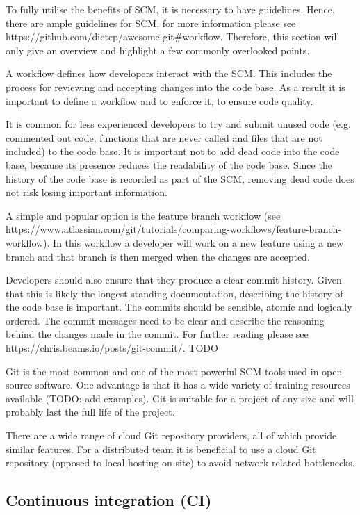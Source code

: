 \documentclass[jnr]{iosart2x}
\begin{document}
\begin{itemzie}
To fully utilise the benefits of SCM, it is necessary to have guidelines.
Hence, there are ample guidelines for SCM, for more information please see https://github.com/dictcp/awesome-git\#workflow.
Therefore, this section will only give an overview and highlight a few commonly overlooked points.

A workflow defines how developers interact with the SCM.
This includes the process for reviewing and accepting changes into the code base.
As a result it is important to define a workflow and to enforce it, to ensure code quality.

It is common for less experienced developers to try and submit unused code (e.g. commented out code, functions that are never called and files that are not included) to the code base.
It is important not to add dead code into the code base, because
its presence reduces the readability of the code base.
Since the history of the code base is recorded as part of the SCM, removing dead code does not risk losing important information.

A simple and popular option is the feature branch workflow (see https://www.atlassian.com/git/tutorials/comparing-workflows/feature-branch-workflow).
In this workflow a developer will work on a new feature using a new branch and that branch is then merged when the changes are accepted.

Developers should also ensure that they produce a clear commit history.
Given that this is likely the longest standing documentation, describing the history of the code base is important.
The commits should be sensible, atomic and logically ordered.
The commit messages need to be clear and describe the reasoning behind the changes made in the commit.
For further reading please see https://chris.beams.io/posts/git-commit/. TODO

Git \cite{Git} is the most common and one of the most powerful SCM tools used in open source software.
One advantage is that it has a wide variety of training resources available (TODO: add examples).
Git is suitable for a project of any size and will probably last the full life of the project.

There are a wide range of cloud Git repository providers, all of which provide similar features.
For a distributed team it is beneficial to use a cloud Git repository (opposed to local hosting on site) to avoid network related bottlenecks.

\subsection{Continuous integration (CI)}
\label{Continuous integration}


\end{itemzie}
\end{document}
